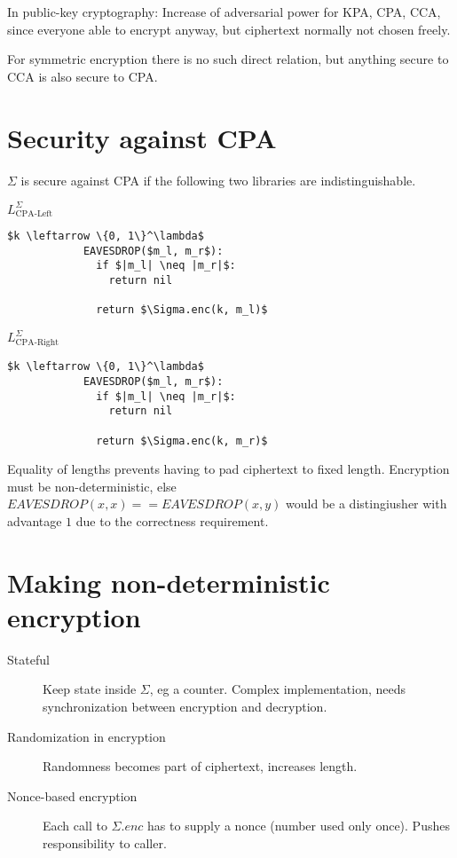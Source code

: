 \documentclass[a4paper]{scrreprt}
\begin{document}
In public-key cryptography: Increase of adversarial power for KPA, CPA, CCA,
since everyone able to encrypt anyway, but ciphertext normally not chosen
freely.

For symmetric encryption there is no such direct relation, but anything secure
to CCA is also secure to CPA.

\section{Security against CPA}

$\Sigma$ is secure against CPA if the following two libraries are indistinguishable.

\begin{tcbraster}[raster columns=2,raster equal height,nobeforeafter,raster column skip=2cm]
	\begin{library}{$L^\Sigma_{\text{CPA-Left}}$}
		\begin{lstlisting}[mathescape=true,autogobble=true]
			$k \leftarrow \{0, 1\}^\lambda$
			EAVESDROP($m_l, m_r$):
			  if $|m_l| \neq |m_r|$:
			    return nil

			  return $\Sigma.enc(k, m_l)$
		\end{lstlisting}
	\end{library}
	\begin{library}{$L^\Sigma_{\text{CPA-Right}}$}
		\begin{lstlisting}[mathescape=true,autogobble=true]
			$k \leftarrow \{0, 1\}^\lambda$
			EAVESDROP($m_l, m_r$):
			  if $|m_l| \neq |m_r|$:
			    return nil

			  return $\Sigma.enc(k, m_r)$
		\end{lstlisting}
	\end{library}
\end{tcbraster}

Equality of lengths prevents having to pad ciphertext to fixed length.
Encryption must be non-deterministic, else $EAVESDROP(x, x) == EAVESDROP(x, y)$
would be a distingiusher with advantage $1$ due to the correctness requirement.

\section{Making non-deterministic encryption}

\begin{description}
	\item[Stateful] Keep state inside $\Sigma$, eg a counter. Complex
		implementation, needs synchronization between encryption and
		decryption.
	\item[Randomization in encryption] Randomness becomes part of
		ciphertext, increases length.
	\item[Nonce-based encryption] Each call to $\Sigma.enc$ has to supply a
		nonce (number used only once). Pushes responsibility to caller.
\end{description}
\end{document}
